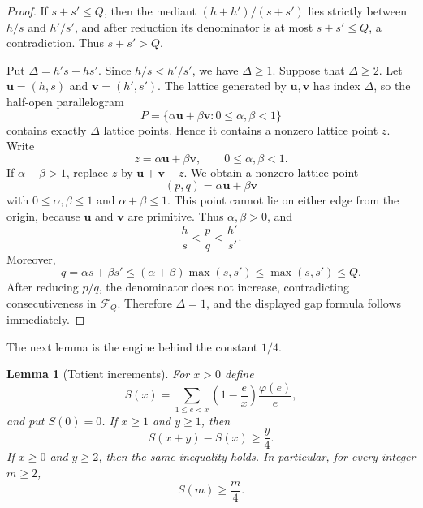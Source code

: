 \documentclass[11pt]{article}
\numberwithin{equation}{section}
\newtheorem{lemma}[theorem]{Lemma}
\theoremstyle{definition}
\theoremstyle{remark}
\newcommand{\1}{\mathbf 1}
\begin{document}
\begin{proof}
If $s+s'\le Q$, then the mediant $(h+h')/(s+s')$ lies strictly between $h/s$ and $h'/s'$, and after reduction its denominator is at most $s+s'\le Q$, a contradiction.  Thus $s+s'>Q$.

Put $\Delta=h's-hs'$.  Since $h/s<h'/s'$, we have $\Delta\ge1$.  Suppose that $\Delta\ge2$.  Let $\mathbf u=(h,s)$ and $\mathbf v=(h',s')$.  The lattice generated by $\mathbf u,\mathbf v$ has index $\Delta$, so the half-open parallelogram
\[
  P=\{\alpha\mathbf u+\beta\mathbf v:0\le \alpha,\beta<1\}
\]
contains exactly $\Delta$ lattice points.  Hence it contains a nonzero lattice point $z$.  Write
\[
  z=\alpha\mathbf u+\beta\mathbf v,
  \qquad 0\le\alpha,\beta<1.
\]
If $\alpha+\beta>1$, replace $z$ by $\mathbf u+\mathbf v-z$.  We obtain a nonzero lattice point
\[
  (p,q)=\alpha\mathbf u+\beta\mathbf v
\]
with $0\le\alpha,\beta\le1$ and $\alpha+\beta\le1$.  This point cannot lie on either edge from the origin, because $\mathbf u$ and $\mathbf v$ are primitive.  Thus $\alpha,\beta>0$, and
\[
  \frac hs<\frac pq<\frac{h'}{s'}.
\]
Moreover,
\[
  q=\alpha s+\beta s'
    \le (\alpha+\beta)\max(s,s')
    \le \max(s,s')\le Q.
\]
After reducing $p/q$, the denominator does not increase, contradicting consecutiveness in $\mathcal F_Q$.  Therefore $\Delta=1$, and the displayed gap formula follows immediately.
\end{proof}

The next lemma is the engine behind the constant $1/4$.

\begin{lemma}[Totient increments]\label{lem:totient-increments}
For $x>0$ define
\[
  S(x)=\sum_{1\le e<x}\left(1-\frac ex\right)\frac{\varphi(e)}e,
\]
and put $S(0)=0$.  If $x\ge1$ and $y\ge1$, then
\[
  S(x+y)-S(x)\ge \frac y4.
\]
If $x\ge0$ and $y\ge2$, then the same inequality holds.  In particular, for every integer $m\ge2$,
\[
  S(m)\ge \frac m4.
\]
\end{lemma}
\end{document}

